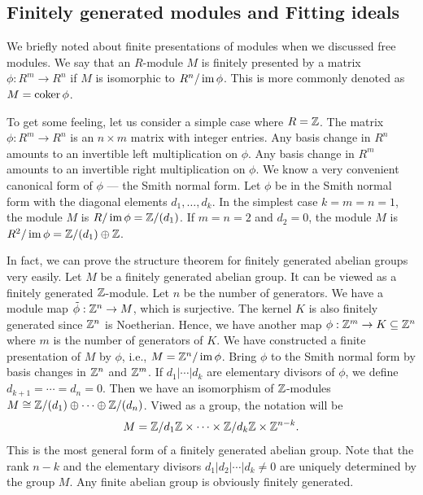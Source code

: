 \subsection*{Finitely generated modules and Fitting ideals}

We briefly noted about finite presentations of modules when we discussed free modules.
We say that an $R$-module $M$ is finitely presented by a matrix $\phi : R^m \to R^n$
if $M$ is isomorphic to $R^n / \mathop{\mathrm{im}}\nolimits \phi$. This is more commonly denoted as $ M = \mathop{\mathrm{coker}}\nolimits \phi$.

To get some feeling, let us consider a simple case where $R = \mathbb{Z}$.
The matrix $\phi: R^m \to R^n$ is an $n \times m$ matrix with integer entries.
Any basis change in $R^n$ amounts to an invertible left multiplication on $\phi$.
Any basis change in $R^m$ amounts to an invertible right multiplication on $\phi$.
We know a very convenient canonical form of $\phi$ --- the Smith normal form.
Let $\phi$ be in the Smith normal form with the diagonal elements $d_1, \ldots, d_k$.
In the simplest case $k = m = n =1$, the module $M$ is $R / \mathop{\mathrm{im}}\nolimits \phi = \mathbb{Z} / (d_1)$.
If $m = n = 2$ and $d_2 = 0$, the module $M$ is $R^2 / \mathop{\mathrm{im}}\nolimits \phi = \mathbb{Z}/(d_1) \oplus \mathbb{Z}$.

In fact, we can prove the structure theorem for finitely generated abelian groups very easily.
Let $M$ be a finitely generated abelian group. It can be viewed as a finitely generated
$\mathbb{Z}$-module. Let $n$ be the number of generators. We have a module map $\tilde \phi : \mathbb{Z}^n \to M$,
which is surjective. The kernel $K$ is also finitely generated since $\mathbb{Z}^n$ is Noetherian.
Hence, we have another map $\phi : \mathbb{Z}^m \to K \subseteq \mathbb{Z}^n$ where $m$ is the number of
generators of $K$. We have constructed a finite presentation of $M$ by $\phi$, i.e., $M = \mathbb{Z}^n / \mathop{\mathrm{im}}\nolimits \phi$.
Bring $\phi$ to the Smith normal form by basis changes in $\mathbb{Z}^n$ and $\mathbb{Z}^m$.
If $d_1 | \cdots | d_k$ are elementary divisors of $\phi$,
we define $d_{k+1} = \cdots = d_n = 0$.
Then we have an isomorphism of $\mathbb{Z}$-modules $M \cong \mathbb{Z}/(d_1) \oplus \cdots \oplus \mathbb{Z}/(d_n)$.
Viwed as a group, the notation will be
\[
 M = \mathbb{Z}/d_1 \mathbb{Z} \times \cdots \times \mathbb{Z}/d_k \mathbb{Z} \times \mathbb{Z}^{n-k} .
\]
This is the most general form of a finitely generated abelian group.
Note that the rank $n-k$ and the elementary divisors 
$d_1 | d_2 | \cdots | d_k \neq 0$ are uniquely determined by the group $M$.
Any finite abelian group is obviously finitely generated.


